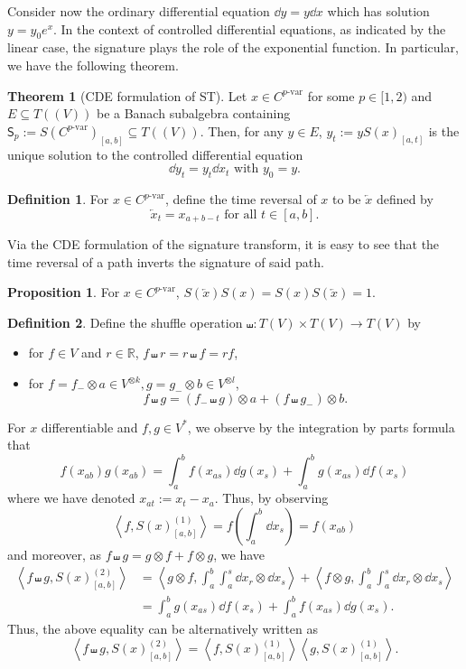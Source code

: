 \documentclass[]{article}
\theoremstyle{definition}
\newtheorem{theorem}{Theorem}
\theoremstyle{definition}
\newtheorem{definition}{Definition}
\newtheorem{proposition}{Proposition}[section]
\def\<{\left\langle}
\def\>{\right\rangle}
\newcommand{\pvar}{{p\text{-var}}}
\begin{document}
Consider now the ordinary differential equation \(\dd y = y \dd x\) which has solution \(y = y_0 e^x\). 
In the context of controlled differential equations, as indicated by the linear case, the signature 
plays the role of the exponential function. In particular, we have the following theorem.

\begin{theorem}[CDE formulation of ST]
  Let \(x \in C^\pvar\) for some \(p \in [1, 2)\) and \(E \subseteq T((V))\) be a Banach subalgebra 
  containing \(\mathsf{S}_p := S(C^\pvar)_{[a, b]} \subseteq T((V))\). Then, for any \(y \in E\), 
  \(y_t := y S(x)_{[a, t]}\) is the unique solution to the controlled differential equation
  \[\dd y_t = y_t \dd x_t \text{ with } y_0 = y.\]
\end{theorem}

\begin{definition}
  For \(x \in C^\pvar\), define the time reversal of \(x\) to be \(\overleftarrow{x}\) defined by 
  \[\overleftarrow{x}_t = x_{a + b - t} \text{ for all } t \in [a, b].\]
\end{definition}

Via the CDE formulation of the signature transform, it is easy to see that the time reversal of a path
inverts the signature of said path.

\begin{proposition}
  For \(x \in C^\pvar\), \(S(\overleftarrow{x}) S(x) = S(x) S(\overleftarrow{x}) = 1\).
\end{proposition}

\begin{definition}
  Define the shuffle operation \(\shuffle : T(V) \times T(V) \to T(V)\) by
  \begin{itemize}
    \item for \(f \in V\) and \(r \in \mathbb{R}\), \(f \shuffle r = r \shuffle f = rf\),
    \item for \(f = f_{-} \otimes a \in V^{\otimes k}, g = g_{-} \otimes b \in V^{\otimes l}\),
      \[f \shuffle g = (f_{-} \shuffle g) \otimes a + (f \shuffle g_{-}) \otimes b.\]
  \end{itemize}
\end{definition}

For \(x\) differentiable and \(f, g \in V^*\), we observe by the integration by parts formula that 
\[f(x_{ab})g(x_{ab}) = \int_a^b f(x_{as}) \dd g(x_s) + \int_a^b g(x_{as})\dd f(x_s)\]
where we have denoted \(x_{at} := x_t - x_a\). Thus, by observing 
\[\<f, S(x)^{(1)}_{[a, b]}\> = f\left(\int_a^b \dd x_s\right) = f(x_{ab})\]
and moreover, as \(f \shuffle g = g \otimes f + f \otimes g\), we have
\begin{align*}
  \<f \shuffle g, S(x)^{(2)}_{[a, b]}\> & = 
  \<g \otimes f, \int_a^b \int_a^s \dd x_r \otimes \dd x_s\>
  + \<f \otimes g, \int_a^b \int_a^s \dd x_r \otimes \dd x_s\>\\ 
  & = \int_a^b g(x_{as})\dd f(x_s) + \int_a^b f(x_{as}) \dd g(x_s).
\end{align*}
Thus, the above equality can be alternatively written as 
\[\<f \shuffle g, S(x)^{(2)}_{[a, b]}\> = \<f, S(x)^{(1)}_{[a, b]}\>\<g, S(x)^{(1)}_{[a, b]}\>.\]
\end{document}
